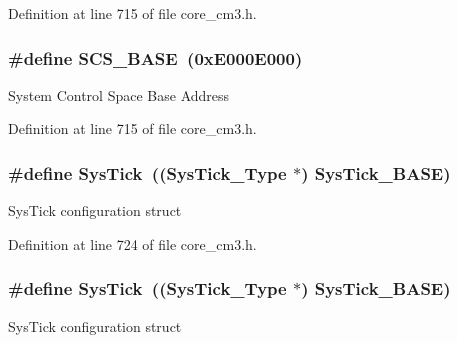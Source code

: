 Definition at line 715 of file core\+\_\+cm3.\+h.

\subsubsection[{\texorpdfstring{S\+C\+S\+\_\+\+B\+A\+SE}{SCS_BASE}}]{\setlength{\rightskip}{0pt plus 5cm}\#define S\+C\+S\+\_\+\+B\+A\+SE~(0x\+E000\+E000)}\hypertarget{group___c_m_s_i_s___c_m3__core__register_ga3c14ed93192c8d9143322bbf77ebf770}{}\label{group___c_m_s_i_s___c_m3__core__register_ga3c14ed93192c8d9143322bbf77ebf770}
System Control Space Base Address 

Definition at line 715 of file core\+\_\+cm3.\+h.

\subsubsection[{\texorpdfstring{Sys\+Tick}{SysTick}}]{\setlength{\rightskip}{0pt plus 5cm}\#define Sys\+Tick~(({\bf Sys\+Tick\+\_\+\+Type} $\ast$)       {\bf Sys\+Tick\+\_\+\+B\+A\+SE})}\hypertarget{group___c_m_s_i_s___c_m3__core__register_gacd96c53beeaff8f603fcda425eb295de}{}\label{group___c_m_s_i_s___c_m3__core__register_gacd96c53beeaff8f603fcda425eb295de}
Sys\+Tick configuration struct 

Definition at line 724 of file core\+\_\+cm3.\+h.

\subsubsection[{\texorpdfstring{Sys\+Tick}{SysTick}}]{\setlength{\rightskip}{0pt plus 5cm}\#define Sys\+Tick~(({\bf Sys\+Tick\+\_\+\+Type} $\ast$)       {\bf Sys\+Tick\+\_\+\+B\+A\+SE})}\hypertarget{group___c_m_s_i_s___c_m3__core__register_gacd96c53beeaff8f603fcda425eb295de}{}\label{group___c_m_s_i_s___c_m3__core__register_gacd96c53beeaff8f603fcda425eb295de}
Sys\+Tick configuration struct 

